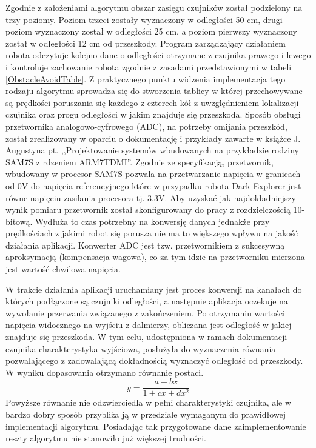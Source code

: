 Zgodnie z założeniami algorytmu obszar zasięgu czujników został podzielony na
trzy poziomy. Poziom trzeci zostały wyznaczony w odległości 50 cm, drugi poziom
wyznaczony został w odległości 25 cm, a poziom pierwszy wyznaczony został w
odległości 12 cm od przeszkody. Program zarządzający działaniem robota odczytuje
kolejno dane o odległości otrzymane z czujnika prawego i lewego i kontroluje
zachowanie robota zgodnie z zasadami przedstawionymi w tabeli \ref{ObstacleAvoidTable}.
Z praktycznego punktu widzenia implementacja tego rodzaju algorytmu sprowadza
się do stworzenia tablicy w której przechowywane są prędkości poruszania się każdego z
czterech kół z uwzględnieniem lokalizacji czujnika oraz progu odległości w jakim
znajduje się przeszkoda.
\newpage
Sposób obsługi przetwornika analogowo-cyfrowego (ADC), na potrzeby omijania
przeszkód, został zrealizowany w oparciu o dokumentację i przykłady zawarte w
książce J. Augustyna pt. ,,Projektowanie systemów wbudowanych na przykładzie
rodziny SAM7S z rdzeniem ARM7TDMI''. Zgodnie ze specyfikacją, przetwornik,
wbudowany w procesor SAM7S pozwala na przetwarzanie napięcia w granicach od 0V do
napięcia referencyjnego które w przypadku robota Dark Explorer jest równe
napięciu zasilania procesora tj. 3.3V. Aby uzyskać jak najdokładniejszy wynik
pomiaru przetwornik został skonfigurowany do pracy z rozdzielczością 10-bitową.
Wydłuża to czas potrzebny na konwersję danych jednakże przy prędkościach z jakimi
robot się porusza nie ma to większego wpływu na jakość działania aplikacji.
Konwerter ADC jest tzw. przetwornikiem z sukcesywną aproksymacją (kompensacja
wagowa), co za tym idzie na przetworniku mierzona jest wartość chwilowa
napięcia\cite{JAugustyn}.

W trakcie działania aplikacji uruchamiany jest proces konwersji na kanałach do
których podłączone są czujniki odległości, a następnie aplikacja oczekuje na
wywołanie przerwania związanego z zakończeniem. Po otrzymaniu wartości napięcia
widocznego na wyjściu z dalmierzy, obliczana jest odległość w jakiej znajduje
się przeszkoda. W tym celu, udostępniona w ramach dokumentacji czujnika\cite{GP2D12DataSheet}
charakterystyka wyjściowa, posłużyła do wyznaczenia równania pozwalającego z
zadowalającą dokładnością wyznaczyć odległość od przeszkody. W wyniku
dopasowania otrzymano równanie postaci.
\begin{equation}
y=\frac{a+bx}{1+cx+dx^2}
\end{equation}
Powyższe równanie nie odzwierciedla w pełni charakterystyki czujnika, ale w
bardzo dobry sposób przybliża ją w przedziale wymaganym do prawidłowej
implementacji algorytmu. Posiadając tak przygotowane dane zaimplementowanie
reszty algorytmu nie stanowiło już większej trudności. 

